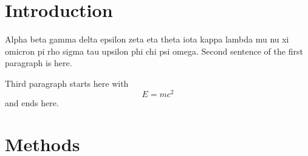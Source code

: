 \documentclass{article}
\begin{document}
\section{Introduction}
Alpha beta gamma delta epsilon zeta eta theta iota kappa lambda mu nu xi omicron pi rho sigma tau
upsilon phi chi psi omega. Second sentence of the first paragraph is here.

Third paragraph starts here with
\begin{equation}
  E = m c^2
\end{equation}
and ends here.

\section{Methods}

\end{document}
